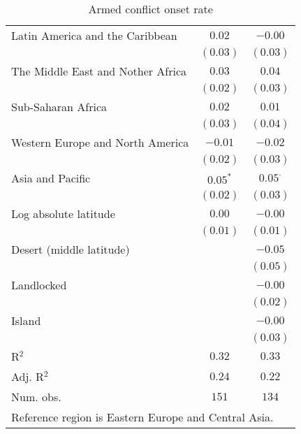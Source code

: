 \begin{table}[H]
\begin{center}
{\begin{tabular}{l c c}
Latin America and the Caribbean   & $0.02$      & $-0.00$        \\
                                  & $(0.03)$    & $(0.03)$       \\
The Middle East and Nother Africa & $0.03$      & $0.04$         \\
                                  & $(0.02)$    & $(0.03)$       \\
Sub-Saharan Africa                & $0.02$      & $0.01$         \\
                                  & $(0.03)$    & $(0.04)$       \\
Western Europe and North America  & $-0.01$     & $-0.02$        \\
                                  & $(0.02)$    & $(0.03)$       \\
Asia and Pacific                  & $0.05^{*}$  & $0.05^{\cdot}$ \\
                                  & $(0.02)$    & $(0.03)$       \\
Log absolute latitude             & $0.00$      & $-0.00$        \\
                                  & $(0.01)$    & $(0.01)$       \\
Desert (middle latitude)          &             & $-0.05$        \\
                                  &             & $(0.05)$       \\
Landlocked                        &             & $-0.00$        \\
                                  &             & $(0.02)$       \\
Island                            &             & $-0.00$        \\
                                  &             & $(0.03)$       \\
\hline
R$^2$                             & $0.32$      & $0.33$         \\
Adj. R$^2$                        & $0.24$      & $0.22$         \\
Num. obs.                         & $151$       & $134$          \\
\hline
\multicolumn{3}{l}{\scriptsize{Reference region is Eastern Europe and Central Asia.}}
\end{tabular}
}
\caption{Armed conflict onset rate}
\label{onsets}
\end{center}
\end{table}
